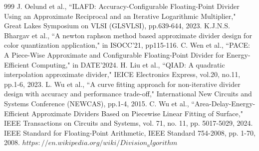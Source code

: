 \documentclass[conference]{IEEEtran}
\begin{document}
\begin{thebibliography}{999}
J. Oelund et al., ``ILAFD: Accuracy-Configurable Floating-Point Divider Using an Approximate Reciprocal and an Iterative Logarithmic Multiplier," Great Lakes Symposium on VLSI (GLSVLSI), pp.639-644, 2023.
K.J.N.S. Bhargav et al., ``A newton raphson method based approximate divider design for color quantization application," in ISOCC'21, pp115-116.
C. Wen et al., ``PACE: A Piece-Wise Approximate and Configurable Floating-Point Divider for Energy-Efficient Computing," in DATE'2024.
 H. Liu et al., ``QIAD: A quadratic interpolation approximate divider," IEICE Electronics Express, vol.20, no.11, pp.1-6, 2023.
L. Wu et al., ``A curve fitting approach for non-iterative divider design with accuracy and performance trade-off," International New Circuits and Systems Conference (NEWCAS), pp.1-4, 2015.
 C. Wu et al., ``Area-Delay-Energy-Efficient Approximate Dividers Based on Piecewise Linear Fitting of Surface," IEEE Transactions on Circuits and Systems, vol. 71, no. 11, pp. 5017-5029, 2024.   
 IEEE Standard for Floating-Point Arithmetic, IEEE Standard 754-2008, pp. 1-70, 2008.
 $https://en.wikipedia.org/wiki/Division_algorithm$

\end{thebibliography}
\end{document}

